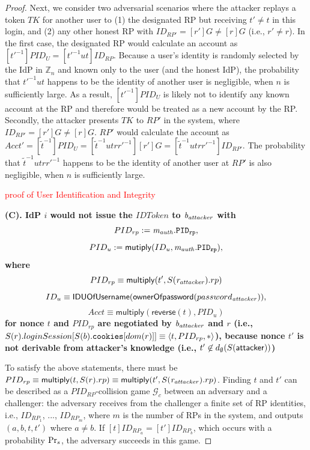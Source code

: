 \begin{theorem}
\begin{proof}
Next, we consider two adversarial scenarios where the attacker replays a token $TK$ for another user to (1) the designated RP but receiving $t'\neq t$ in this login, and (2) any other honest RP with $ID_{RP'} = [r']G \neq [r]G$ (i.e., $r' \neq r$). In the first case, the designated RP would calculate an account as $[t'^{-1}]PID_U = [t'^{-1}ut]ID_{RP}$.
Because a user's identity is randomly selected by the IdP in $\mathbb{Z}_n$ and known only to the user (and the honest IdP), the probability that $t'^{-1}ut$ happens to be the identity of another user is negligible, when $n$ is sufficiently large. As a result, $[t'^{-1}]PID_U$ is likely not to identify any known account at the RP and therefore would be treated as a new account by the RP. 
Secondly, the attacker presents $TK$ to $RP'$ in the system, where $ID_{RP'} = [r']G \neq [r]G$. $RP'$ would calculate the account as $Acct' = [\tilde{t}^{-1}]PID_{U} = [\tilde{t}^{-1}utrr'^{-1}][r']G = [\tilde{t}^{-1}utrr'^{-1}]ID_{RP'}$. The probability that $\tilde{t}^{-1}utrr'^{-1}$ happens to be the identity of another user at $RP'$ is also negligible, when $n$ is sufficiently large. 

    
    \textcolor{red}{proof of User Identification and Integrity}
      
  
  
  \textbf{(C). IdP $i$ would not issue the $IDToken$ to $\mathit{b_{attacker}}$ with 
  $$PID_{rp} := \mathit{m_{auth}}.\mathtt{PID_{rp}} , $$
  $$PID_u := \mathsf{mutiply}(ID_u, \mathit{m_{auth}.\mathtt{PID_{rp}}}),$$
  where
  $$PID_{rp} \equiv \mathsf{multiply}(t', S(\mathit{r_{attacker}}).rp)$$
  $$ID_u \equiv \mathsf{IDUOfUsername} (\mathsf{ownerOfpassword}(password_{\mathit{attacker}})),$$
  $$Acct \equiv \mathsf{multiply}(\mathsf{reverse}(t), PID_u)$$
  for nonce $t$ and $PID_{rp}$ are negotiated by $\mathit{b_{attacker}}$ and $r$ (i.e., $S(r).loginSession[S(b).\mathtt{cookies}[dom(r)]] \equiv \langle t, PID_{rp}, *\rangle$), because nonce $t'$ is not derivable from attacker's knowledge (i.e., $t' \not \in  d_{\emptyset}(S(\mathsf{attacker}))$)}
  
	To satisfy the above statements, there must be $PID_{rp} \equiv \mathsf{multiply}(t, S(r).rp) \equiv \mathsf{multiply}(t', S(\mathit{r_{attacker}}).rp)$. Finding $t$ and $t'$ can be described as a $PID_{RP}$-collision game $\mathcal{G}_c$ between an adversary and a challenger: the adversary receives from the challenger a finite set of RP identities, i.e., $ID_{RP_1}$, ..., $ID_{RP_m}$, where $m$ is the number of RPs in the system, and outputs $(a, b, t, t')$ where $a \neq b$. If $[t]ID_{RP_a}=[t']ID_{RP_b}$, which occurs with a probability ${\rm Pr}_s$, the adversary succeeds in this game.


\end{proof}
\end{theorem}
